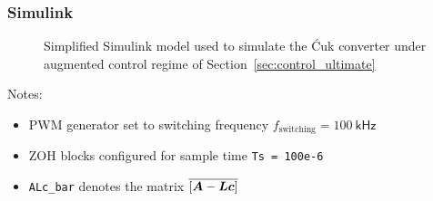 \subsubsection{\textsf{Simulink}}
\begin{figure}[H]
    \centering
    \caption{Simplified \textsf{Simulink} model used to simulate the \'{C}uk converter under augmented control regime of Section~\ref{sec:control_ultimate}}
    \label{fig:simulink}
\end{figure}
Notes:
\begin{itemize}
    \item PWM generator set to switching frequency $f_\text{switching} = 100 \ \mathsf{kHz}$
    \item ZOH blocks configured for sample time \texttt{Ts = 100e-6}
    \item \texttt{ALc\_bar} denotes the matrix $\overline{\left[\boldsymbol{A} - \boldsymbol{L}\boldsymbol{c}\right]}$
\end{itemize}
